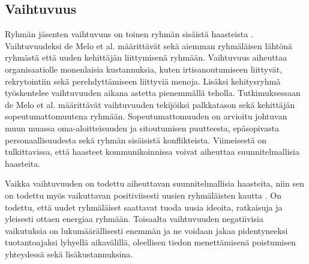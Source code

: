 \subsection{Vaihtuvuus}

Ryhmän jäsenten vaihtuvuus on toinen ryhmän sisäistä haasteista \cite{DEOMELO2013412}. Vaihtuvuudeksi de Melo et al. määrittävät sekä aiemman ryhmäläisen lähtönä ryhmästä että uuden kehittäjän liittymisenä ryhmään. Vaihtuvuus aiheuttaa organisaatiolle monenlaisia kustannuksia, kuten irtisanoutumiseen liittyvät, rekrytointiin sekä perehdyttämiseen liittyviä menoja. Lisäksi kehitysryhmä työskentelee vaihtuvuuden aikana astetta pienemmällä teholla. Tutkimuksessaan de Melo et al. määrittävät vaihtuvuuden tekijöiksi palkkatason sekä kehittäjän sopeutumattomuutena ryhmään. Sopeutumattomuuden on arvioitu johtuvan muun muassa oma-aloitteisuuden ja sitoutumisen puutteesta, epäsopivasta personaallisuudesta sekä ryhmän sisäisistä konflikteista. Viimeisestä on tulkittavissa, että haasteet kommunikoinnissa voivat aiheuttaa suunnitelmallisia haasteita.

Vaikka vaihtuvuuden on todettu aiheuttavan suunnitelmallisia haasteita, niin sen on todettu myös vaikuttavan positiviisesti uusien ryhmäläisten kautta \cite{DEOMELO2013412}. On todettu, että uudet ryhmäläiset saattavat tuoda uusia ideoita, ratkaisuja ja yleisesti ottaen energiaa ryhmään. Toisaalta vaihtuvuuden negatiivisia vaikutuksia on lukumäärällisesti enemmän ja ne voidaan jakaa pidentyneeksi tuotantoajaksi lyhyellä aikavälillä, oleellisen tiedon menettämisenä poistumisen yhteydessä sekä lisäkustannuksina. 
